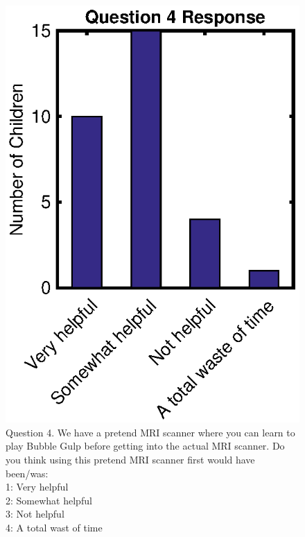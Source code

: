 \begin{appendices}
	\begin{figure}
		\centering
		\includegraphics{figures/gamepaper/Question4}
		\caption[Survey Question 4]{Question 4.	We have a pretend MRI scanner where you can learn to play Bubble Gulp before getting into the actual MRI scanner. Do you think using this pretend MRI scanner first would have been/was: \\ 1: Very helpful \\ 2: Somewhat helpful \\3: Not helpful \\ 4: A total wast of time}
		\label{fig:question4}
	\end{figure}


\end{appendices}
